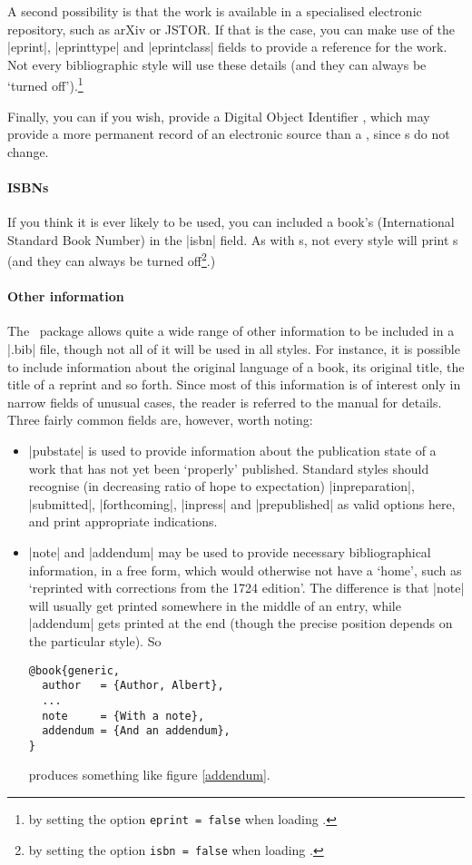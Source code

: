 {A second possibility is that the work is available in a specialised
electronic repository, such as arXiv or JSTOR. If that is the case,
you can make use of the |eprint|, |eprinttype| and |eprintclass|
fields to provide a reference for the work.  Not every bibliographic style will use
these details (and they can always be `turned off').\footnote{by
  setting the option \texttt{eprint = false} when loading \biblatex.}

Finally, you can if you wish, provide a Digital Object Identifier
, which may provide a more permanent record of an
electronic source than a \URL, since s do not
change.

\paragraph{ISBNs} If you think it is ever likely to be used, you can
included a book's  (International Standard Book
Number) in the |isbn| field. As with s, not every style
will print s (and they can always be turned
off\footnote{by setting the option \texttt{isbn = false} when loading
  \biblatex.}.)

\paragraph{Other information} The \biblatex\ package allows quite a
wide range of other information to be included in a |.bib| file,
though not all of it will be used in all styles. For instance, it is
possible to include information about the original language of a book,
its original title, the title of a reprint and so forth. Since most of
this information is of interest only in narrow fields of unusual
cases, the reader is referred to the manual for details. Three fairly
common fields are, however, worth noting:
\begin{itemize}
\item |pubstate| is used to provide information about the publication
  state of a work that has not yet been `properly' published. Standard
  styles should recognise (in decreasing ratio of hope to expectation)
  |inpreparation|, |submitted|, |forthcoming|, |inpress| and
  |prepublished| as valid options here, and print appropriate
  indications.
\item |note| and |addendum| may be used to provide necessary
  bibliographical information, in a free form, which would otherwise
  not have a `home', such as `reprinted with corrections from the 1724
  edition'. The difference is that |note| will usually get printed
  somewhere in the middle of an entry, while |addendum| gets printed
  at the end (though the precise position depends on the particular
  style). So
  \begin{Verbatim}
@book{generic,
  author   = {Author, Albert},
  ...
  note     = {With a note},
  addendum = {And an addendum},
}
\end{Verbatim}
produces something like figure \ref{addendum}.


\end{itemize}}
